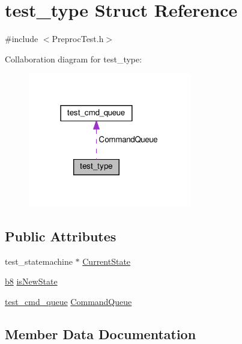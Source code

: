 \hypertarget{structtest__type}{}\section{test\+\_\+type Struct Reference}
\label{structtest__type}


{\ttfamily \#include $<$Preproc\+Test.\+h$>$}



Collaboration diagram for test\+\_\+type\+:\nopagebreak
\begin{figure}[H]
\begin{center}
\leavevmode
\includegraphics[width=202pt]{d5/dfe/structtest__type__coll__graph}
\end{center}
\end{figure}
\subsection*{Public Attributes}
\begin{DoxyCompactItemize}
\item 
test\+\_\+statemachine $\ast$ \hyperlink{structtest__type_a48139457e16e23a57531e5af02be7f14}{Current\+State}
\item 
\hyperlink{ab__common_8h_a70e369648385b50f2d0588e8e8745275}{b8} \hyperlink{structtest__type_a36eb3041ef1341aec27a2a2d98500ce6}{is\+New\+State}
\item 
\hyperlink{structtest__cmd__queue}{test\+\_\+cmd\+\_\+queue} \hyperlink{structtest__type_a9ef32b05c6f8a712062f8261d71665ca}{Command\+Queue}
\end{DoxyCompactItemize}


\subsection{Member Data Documentation}
\mbox{\label{structtest__type_a9ef32b05c6f8a712062f8261d71665ca}} 
